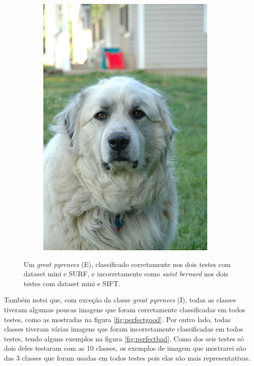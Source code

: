 \begin{figure}
  \centering
  \begin{subfigure}[b]{0.6\textwidth}
    \includegraphics[width=\textwidth]{great_pyrenees.jpg}
  \end{subfigure}
  \caption{Um \textit{great pyrenees} (E), classificado corretamente nos dois testes com dataset mini e SURF, e incorretamente
      como \textit{saint bernard} nos dois testes com dataset mini e SIFT.}
  \label{fig:pyrenees}
\end{figure}

Também notei que, com exceção da classe \textit{great pyrenees} (I), todas as classes tiveram algumas poucas
imagens que foram corretamente classificadas em todos testes, como as mostradas na figura \ref{fig:perfectgood}.
Por outro lado, todas classes tiveram várias imagens que foram incorretamente classificadas em todos testes, tendo
alguns exemplos na figura \ref{fig:perfectbad}. Como
dos seis testes só dois deles testaram com as 10 classes, os exemplos de imagem que mostrarei são das 3 classes
que foram usadas em todos testes pois elas são mais representativas. 

